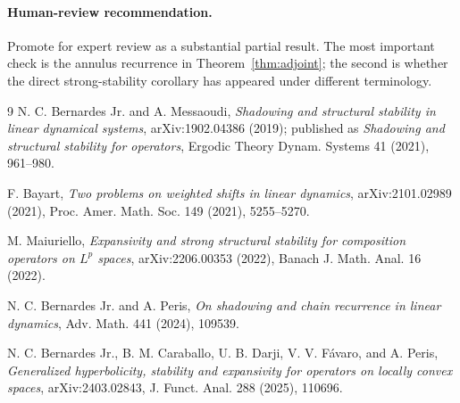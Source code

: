 \documentclass[11pt]{article}
\begin{document}
\paragraph{Human-review recommendation.}
Promote for expert review as a substantial partial result. The most important check is
the annulus recurrence in Theorem~\ref{thm:adjoint}; the second is whether the direct
strong-stability corollary has appeared under different terminology.

\begin{thebibliography}{9}
\small
{}
N. C. Bernardes Jr. and A. Messaoudi,
\emph{Shadowing and structural stability in linear dynamical systems},
arXiv:1902.04386 (2019); published as
\emph{Shadowing and structural stability for operators},
Ergodic Theory Dynam. Systems 41 (2021), 961--980.

F. Bayart,
\emph{Two problems on weighted shifts in linear dynamics},
arXiv:2101.02989 (2021), Proc. Amer. Math. Soc. 149 (2021), 5255--5270.

M. Maiuriello,
\emph{Expansivity and strong structural stability for composition operators on
$L^p$ spaces}, arXiv:2206.00353 (2022), Banach J. Math. Anal. 16 (2022).

N. C. Bernardes Jr. and A. Peris,
\emph{On shadowing and chain recurrence in linear dynamics},
Adv. Math. 441 (2024), 109539.

N. C. Bernardes Jr., B. M. Caraballo, U. B. Darji, V. V. F\'avaro, and A. Peris,
\emph{Generalized hyperbolicity, stability and expansivity for operators on locally
convex spaces}, arXiv:2403.02843, J. Funct. Anal. 288 (2025), 110696.
\end{thebibliography}
\end{document}
